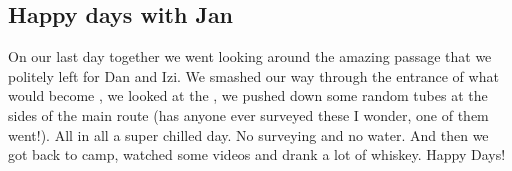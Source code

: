 



\subsection{Happy days with Jan}

On our last day together we went looking around the amazing passage that
we politely left for Dan and Izi. We smashed our way through the
entrance of what would become , we looked at the
, we pushed down some random tubes at the sides of
the main route (has anyone ever surveyed these I wonder, one of them
went!). All in all a super chilled day. No surveying and no water. And
then we got back to camp, watched some videos and drank a lot of
whiskey. Happy Days!





